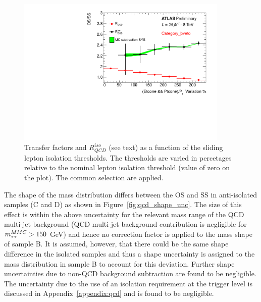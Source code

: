 \begin{figure}[tp]
	\begin{center}
	\includegraphics[page=5,width=0.9\textwidth]{figure/QCD/qcd_plot.pdf}
	\end{center}
	\caption{Transfer factors \rqcd and $R_{QCD}^{iso}$  (see text) as a function of the sliding lepton isolation 
	thresholds. The thresholds are varied in percetages relative to the nominal lepton isolation threshold (value of zero on the plot).
	The common selection are applied.
	 }
	\label{fig:os_ss_ratio}
\end{figure}

The shape of the \mmc mass distribution differs between the OS and SS in 
anti-isolated samples (C and D) as shown in Figure~\ref{fig:qcd_shape_unc}.
The size of this effect is within the above \rqcd uncertainty for the  relevant mass range of the QCD multi-jet background (QCD multi-jet background
contribution is negligible for $m_{\tau\tau}^{MMC}  > 150$ GeV) and hence no correction factor is applied to the mass shape of sample B. 
It is assumed, however, that there could be the same 
shape difference in the isolated samples and thus a shape uncertainty is  assigned to the mass distribution in 
sample B to account for this  deviation. Further 
shape uncertainties due to non-QCD background subtraction are found to be negligible. The uncertainty due to the use of an isolation 
requirement at the trigger level is discussed in Appendix~\ref{appendix:qcd} and is found to be negligible.


